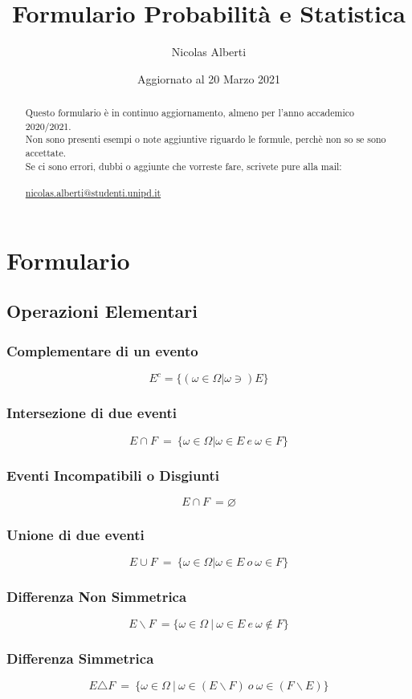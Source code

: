 \documentclass{report}
\title{Formulario Probabilità e Statistica}
\author{Nicolas Alberti}
\date{Aggiornato al 20 Marzo 2021}
\begin{document}
\maketitle
\tableofcontents
\begin{abstract}
    Questo formulario è in continuo aggiornamento, almeno per l'anno accademico 2020/2021.\\
    Non sono presenti esempi o note aggiuntive riguardo le formule, perchè non so se sono accettate.\\
    Se ci sono errori, dubbi o aggiunte che vorreste fare, scrivete pure alla mail:\\
    \\
    \href{mailto:nicolas.alberti@studenti.unipd.it}{nicolas.alberti@studenti.unipd.it}
\end{abstract}
\chapter{Formulario}
\section{Operazioni Elementari}
\subsection{Complementare di un evento}
\[E^c = \{(\omega \in \Omega | \omega \ni)E\}\]
\subsection{Intersezione di due eventi}
\[E \cap F\ =\ \{\omega \in \Omega | \omega \in E\ e\ \omega \in F\}\]
\subsection{Eventi Incompatibili o Disgiunti}
\[E \cap F\ = \varnothing \]
\subsection{Unione di due eventi}
\[E \cup F\ =\ \{\omega \in \Omega | \omega\in E\ o\ \omega \in F\}\]
\subsection{Differenza Non Simmetrica}
\[E\backslash F\ = \{\omega \in \Omega\ |\ \omega \in E\ e\ \omega \not\in F\}\]
\subsection{Differenza Simmetrica}
\[E \triangle F\ =\ \{\omega \in \Omega\ |\ \omega \in (E\backslash F)\ o\ \omega \in (F \backslash E)\}\]
\end{document}
